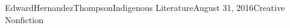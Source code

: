 \documentclass[12pt,letterpaper]{article}
\begin{document}
\begin{mla}{Edward}{Hernandez}{Thompson}{Indigenous Literature}{August 31, 2016}{Creative Nonfiction}






\end{mla}
\end{document}
